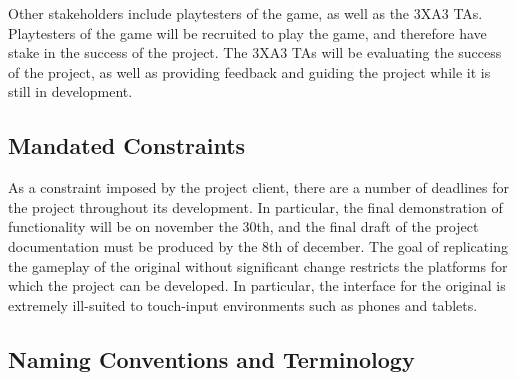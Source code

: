 \documentclass[12pt, titlepage]{article}
\begin{document}
Other stakeholders include playtesters of the game, as well as the 3XA3 TAs. Playtesters of the game will be recruited to play the game, and therefore have stake in the success of the project. The 3XA3 TAs will be evaluating the success of the project, as well as providing feedback and guiding the project while it is still in development.

	\subsection{Mandated Constraints}

As a constraint imposed by the project client, there are a number of deadlines for the project throughout its development. In particular, the final demonstration of functionality will be on november the 30th, and the final draft of the project documentation must be produced by the 8th of december. The goal of replicating the gameplay of the original without significant change restricts the platforms for which the project can be developed. In particular, the interface for the original is extremely ill-suited to touch-input environments such as phones and tablets. 

	\subsection{Naming Conventions and Terminology}
\end{document}
